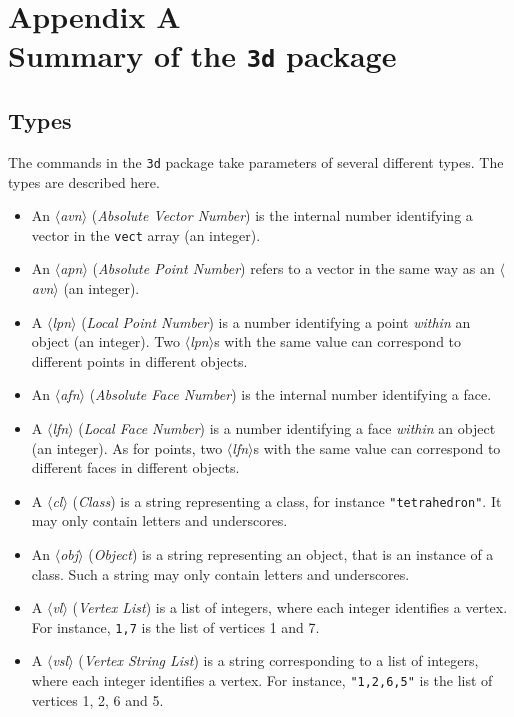 \documentclass[nonumber,harvardcite]{ltugboat}
\DeclareRobustCommand\meta[1]{%
       \ensuremath{\langle}\emph{#1}\ensuremath{\rangle}}
\newcommand{\AVN}{\meta{avn}}
\newcommand{\APN}{\meta{apn}}
\newcommand{\LPN}{\meta{lpn}}
\newcommand{\AFN}{\meta{afn}}
\newcommand{\LFN}{\meta{lfn}}
\newcommand{\CN}{\meta{cl}}
\newcommand{\IN}{\meta{obj}}
\newcommand{\VL}{\meta{vl}}
\newcommand{\VSL}{\meta{vsl}}
\begin{document}


\appendix

\section{Appendix A\\
Summary of the \texttt{3d} package}

\subsection{Types}

The commands in the \texttt{3d} package take parameters
of several different types. The types are described here.

\begin{itemize}
\item An \AVN{} (\emph{Absolute Vector Number}) is the internal
number identifying a vector in the \verb|vect| array (an integer).
\item An \APN{} (\emph{Absolute Point Number}) refers to a vector
in the same way as an \AVN{} (an integer). 
\item A \LPN{} (\emph{Local Point Number}) is a number identifying a
point \emph{within} an object (an integer). Two \LPN{}s with the same value
can correspond to different points in different objects.
\item An \AFN{} (\emph{Absolute Face Number}) is the internal
number identifying a face.
\item A \LFN{} (\emph{Local Face Number}) is a number identifying a face
\emph{within} an object (an integer). As for points, two \LFN{}s with
the same value
can correspond to different faces in different objects.
\item A \CN{} (\emph{Class}) is a string representing a class,
for instance \verb|"tetrahedron"|. It may only contain
letters and underscores.
\item An \IN{} (\emph{Object}) is a string representing an object, that is
an instance of a class. Such a string may only contain
letters and underscores.
\item A \VL{} (\emph{Vertex List}) is a list
of integers, where each integer identifies a vertex. For instance, \verb|1,7|
is the list of vertices 1 and 7.
\item A \VSL{} (\emph{Vertex String List}) is a string corresponding to a list
of integers, where each integer identifies a vertex. For instance, 
\verb|"1,2,6,5"| is the list of vertices 1, 2, 6 and 5.

\end{itemize}
\end{document}
